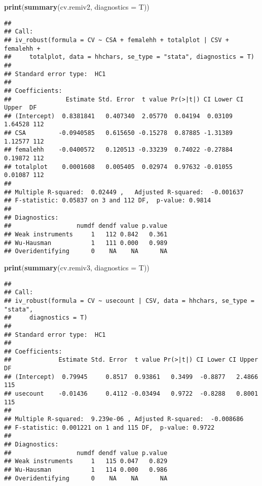 \documentclass[
]{article}
\newenvironment{Shaded}{\begin{snugshade}}{\end{snugshade}}
\newcommand{\DataTypeTok}[1]{\textcolor[rgb]{0.13,0.29,0.53}{#1}}
\newcommand{\KeywordTok}[1]{\textcolor[rgb]{0.13,0.29,0.53}{\textbf{#1}}}
\newcommand{\NormalTok}[1]{#1}
\begin{document}
\begin{Shaded}
\begin{Highlighting}[]
\KeywordTok{print}\NormalTok{(}\KeywordTok{summary}\NormalTok{(cv.remiv2, }\DataTypeTok{diagnostics =}\NormalTok{ T))}
\end{Highlighting}
\end{Shaded}

\begin{verbatim}
## 
## Call:
## iv_robust(formula = CV ~ CSA + femalehh + totalplot | CSV + femalehh + 
##     totalplot, data = hhchars, se_type = "stata", diagnostics = T)
## 
## Standard error type:  HC1 
## 
## Coefficients:
##               Estimate Std. Error  t value Pr(>|t|) CI Lower CI Upper  DF
## (Intercept)  0.8381841   0.407340  2.05770  0.04194  0.03109  1.64528 112
## CSA         -0.0940585   0.615650 -0.15278  0.87885 -1.31389  1.12577 112
## femalehh    -0.0400572   0.120513 -0.33239  0.74022 -0.27884  0.19872 112
## totalplot    0.0001608   0.005405  0.02974  0.97632 -0.01055  0.01087 112
## 
## Multiple R-squared:  0.02449 ,   Adjusted R-squared:  -0.001637 
## F-statistic: 0.05837 on 3 and 112 DF,  p-value: 0.9814
## 
## Diagnostics:
##                  numdf dendf value p.value
## Weak instruments     1   112 0.842   0.361
## Wu-Hausman           1   111 0.000   0.989
## Overidentifying      0    NA    NA      NA
\end{verbatim}

\begin{Shaded}
\begin{Highlighting}[]
\KeywordTok{print}\NormalTok{(}\KeywordTok{summary}\NormalTok{(cv.remiv3, }\DataTypeTok{diagnostics =}\NormalTok{ T))}
\end{Highlighting}
\end{Shaded}

\begin{verbatim}
## 
## Call:
## iv_robust(formula = CV ~ usecount | CSV, data = hhchars, se_type = "stata", 
##     diagnostics = T)
## 
## Standard error type:  HC1 
## 
## Coefficients:
##             Estimate Std. Error  t value Pr(>|t|) CI Lower CI Upper  DF
## (Intercept)  0.79945     0.8517  0.93861   0.3499  -0.8877   2.4866 115
## usecount    -0.01436     0.4112 -0.03494   0.9722  -0.8288   0.8001 115
## 
## Multiple R-squared:  9.239e-06 , Adjusted R-squared:  -0.008686 
## F-statistic: 0.001221 on 1 and 115 DF,  p-value: 0.9722
## 
## Diagnostics:
##                  numdf dendf value p.value
## Weak instruments     1   115 0.047   0.829
## Wu-Hausman           1   114 0.000   0.986
## Overidentifying      0    NA    NA      NA
\end{verbatim}
\end{document}
